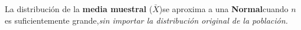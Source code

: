 \documentclass[preview]{standalone}
\begin{document}
\begin{center}
La distribución de la \textbf{media muestral} ($\bar{X}$)se aproxima a una \textbf{Normal}cuando $n$ es suficientemente grande,\textit{sin importar la distribución original de la población.}
\end{center}
\end{document}
